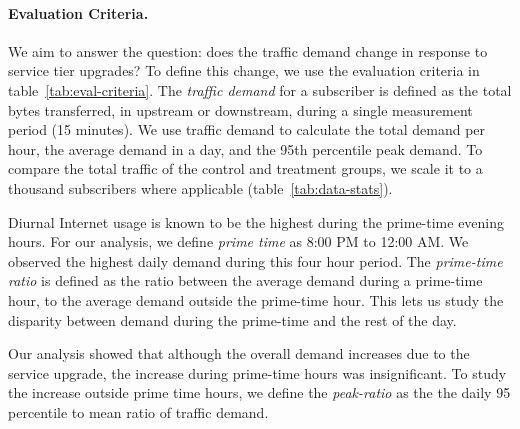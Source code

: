 \paragraph{Evaluation Criteria. } We aim to answer the question: does the 
traffic
demand change in response to service tier upgrades? To define this change, we 
use 
the evaluation criteria in table~\ref{tab:eval-criteria}. The \emph{traffic 
demand} for a subscriber is defined as the total bytes transferred, in 
upstream or downstream, during a single measurement period (15 
minutes).
We use traffic demand to calculate the total demand per hour, the average demand 
in a day,
and the 95th percentile peak demand. To compare the total traffic of the
control and treatment groups, we scale it to a thousand subscribers where
applicable (table~\ref{tab:data-stats}).

Diurnal Internet usage is known to be the highest during the prime-time evening 
hours.
For our analysis, we define \emph{prime time} as 8:00 PM to 12:00 AM. We 
observed the highest
daily demand during this four hour period. The \emph{prime-time ratio} is 
defined as the ratio between 
the average demand during a prime-time hour, to the average demand outside the 
prime-time hour. This lets us study the disparity between demand during the
prime-time and the rest of the day.

Our analysis showed that although the overall demand increases due to the 
service upgrade, 
the increase during prime-time hours was insignificant. To study the increase 
outside
prime time hours, we define the \emph{peak-ratio} as the the daily 95 percentile 
to mean ratio
of traffic demand.







%